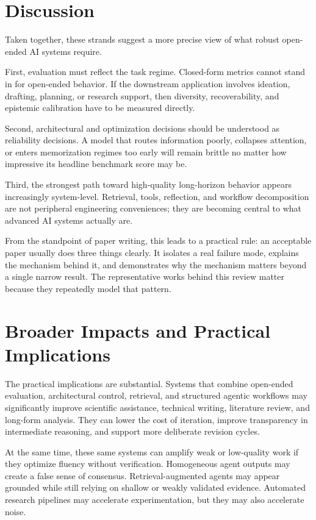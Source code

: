 \documentclass[10pt,twocolumn]{article}
\begin{document}
\section{Discussion}
Taken together, these strands suggest a more precise view of what robust open-ended AI systems require.

First, evaluation must reflect the task regime. Closed-form metrics cannot stand in for open-ended behavior. If the downstream application involves ideation, drafting, planning, or research support, then diversity, recoverability, and epistemic calibration have to be measured directly.

Second, architectural and optimization decisions should be understood as reliability decisions. A model that routes information poorly, collapses attention, or enters memorization regimes too early will remain brittle no matter how impressive its headline benchmark score may be.

Third, the strongest path toward high-quality long-horizon behavior appears increasingly system-level. Retrieval, tools, reflection, and workflow decomposition are not peripheral engineering conveniences; they are becoming central to what advanced AI systems actually are.

From the standpoint of paper writing, this leads to a practical rule: an acceptable paper usually does three things clearly. It isolates a real failure mode, explains the mechanism behind it, and demonstrates why the mechanism matters beyond a single narrow result. The representative works behind this review matter because they repeatedly model that pattern.

\section{Broader Impacts and Practical Implications}
The practical implications are substantial. Systems that combine open-ended evaluation, architectural control, retrieval, and structured agentic workflows may significantly improve scientific assistance, technical writing, literature review, and long-form analysis. They can lower the cost of iteration, improve transparency in intermediate reasoning, and support more deliberate revision cycles.

At the same time, these same systems can amplify weak or low-quality work if they optimize fluency without verification. Homogeneous agent outputs may create a false sense of consensus. Retrieval-augmented agents may appear grounded while still relying on shallow or weakly validated evidence. Automated research pipelines may accelerate experimentation, but they may also accelerate noise.
\end{document}
